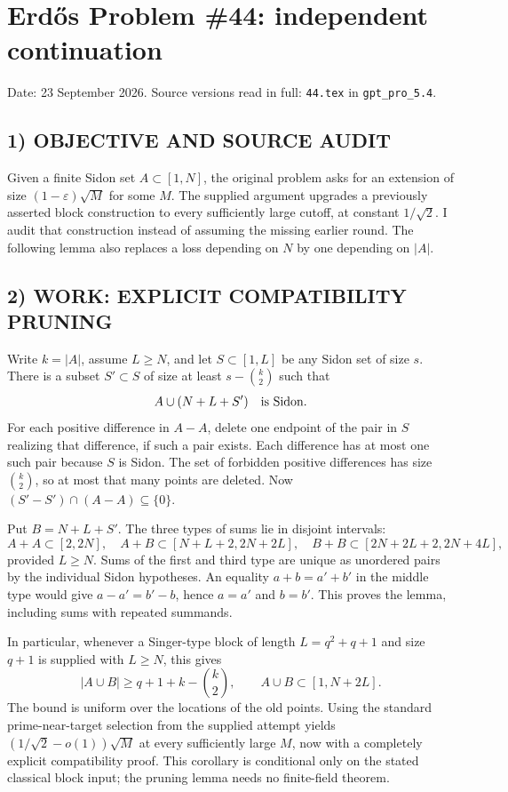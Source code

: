 \section{Erd\H{o}s Problem \#44: independent continuation}
\noindent Date: 23 September 2026. Source versions read in full: \texttt{44.tex} in \texttt{gpt\_pro\_5.4}.

\subsection*{1) OBJECTIVE AND SOURCE AUDIT}
Given a finite Sidon set $A\subset[1,N]$, the original problem asks for
an extension of size $(1-\varepsilon)\sqrt M$ for some $M$.
The supplied argument upgrades a previously asserted block construction
to every sufficiently large cutoff, at constant $1/\sqrt2$. I audit that
construction instead of assuming the missing earlier round. The following
lemma also replaces a loss depending on $N$ by one depending on $|A|$.

\subsection*{2) WORK: EXPLICIT COMPATIBILITY PRUNING}
Write $k=|A|$, assume $L\ge N$, and let $S\subset[1,L]$ be any Sidon set of size $s$.
There is a subset $S'\subset S$ of size at least
$s-\binom{k}{2}$ such that
\[
 A\cup(N+L+S')\quad\hbox{is Sidon}.
\]
For each positive difference in $A-A$, delete one endpoint of the pair
in $S$ realizing that difference, if such a pair exists. Each difference
has at most one such pair because $S$ is Sidon. The set of forbidden positive
differences has size $\binom{k}{2}$, so at most that many points are deleted.
Now $(S'-S')\cap(A-A)\subseteq\{0\}$.

Put $B=N+L+S'$. The three types of sums lie in disjoint intervals:
\[
 A+A\subset[2,2N],\quad A+B\subset[N+L+2,2N+2L],\quad
 B+B\subset[2N+2L+2,2N+4L],
\]
provided $L\ge N$. Sums of the first and third type are unique as unordered
pairs by the individual Sidon hypotheses. An equality
$a+b=a'+b'$ in the middle type would give $a-a'=b'-b$, hence $a=a'$ and
$b=b'$. This proves the lemma, including sums with repeated summands.

In particular, whenever a Singer-type block of length $L=q^2+q+1$
and size $q+1$ is supplied with $L\ge N$, this gives
\[
 |A\cup B|\ge q+1+k-\binom{k}{2},\qquad
 A\cup B\subset[1,N+2L].
\]
The bound is uniform over the locations of the old points. Using the
standard prime-near-target selection from the supplied attempt yields
$(1/\sqrt2-o(1))\sqrt M$ at every sufficiently large $M$, now with
a completely explicit compatibility proof. This corollary is conditional
only on the stated classical block input; the pruning lemma needs no
finite-field theorem.

